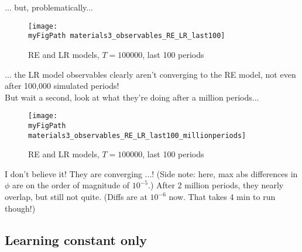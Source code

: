 \documentclass[11pt]{article}
\def \myFigPath {../figures/}
\renewcommand{\[}{\begin{equation}}
\renewcommand{\]}{\end{equation}}
\def\myFigScale{0.3}
\begin{document}
... but, problematically...

\newpage

\begin{figure}[h!]
\texttt{[image: \\myFigPath materials3\_observables\_RE\_LR\_last100]}
\caption{RE and LR models, $T = 100000$, last 100 periods}
\end{figure}

... the LR model observables clearly aren't converging to the RE model, not even after 100,000 simulated periods! \\
But wait a second, look at what they're doing after a million periods...
\begin{figure}[h!]
\texttt{[image: \\myFigPath materials3\_observables\_RE\_LR\_last100\_millionperiods]}
\caption{RE and LR models, $T = 100000$, last 100 periods}
\end{figure}

I don't believe it! They are converging ...! (Side note: here, max abs differences in $\phi$ are on the order of magnitude of $10^{-5}$.) After 2 million periods, they nearly overlap, but still not quite. (Diffs are at $10^{-6}$ now. That takes 4 min to run though!)

\newpage
\subsection{Learning constant only}

 
 
\end{document}
